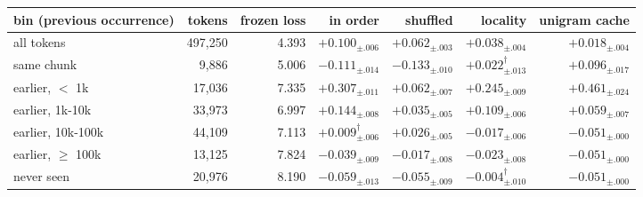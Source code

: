\begin{tabular}{lrrrrrr}
\toprule
bin (previous occurrence) & tokens & frozen loss & in order & shuffled & locality & unigram cache \\
\midrule
all tokens & 497,250 & 4.393 & $+0.100_{\pm .006}$ & $+0.062_{\pm .003}$ & $+0.038_{\pm .004}$ & $+0.018_{\pm .004}$ \\
same chunk & 9,886 & 5.006 & $-0.111_{\pm .014}$ & $-0.133_{\pm .010}$ & $+0.022_{\pm .013}^{\dagger}$ & $+0.096_{\pm .017}$ \\
earlier, $<$ 1k & 17,036 & 7.335 & $+0.307_{\pm .011}$ & $+0.062_{\pm .007}$ & $+0.245_{\pm .009}$ & $+0.461_{\pm .024}$ \\
earlier, 1k-10k & 33,973 & 6.997 & $+0.144_{\pm .008}$ & $+0.035_{\pm .005}$ & $+0.109_{\pm .006}$ & $+0.059_{\pm .007}$ \\
earlier, 10k-100k & 44,109 & 7.113 & $+0.009_{\pm .006}^{\dagger}$ & $+0.026_{\pm .005}$ & $-0.017_{\pm .006}$ & $-0.051_{\pm .000}$ \\
earlier, $\geq$ 100k & 13,125 & 7.824 & $-0.039_{\pm .009}$ & $-0.017_{\pm .008}$ & $-0.023_{\pm .008}$ & $-0.051_{\pm .000}$ \\
never seen & 20,976 & 8.190 & $-0.059_{\pm .013}$ & $-0.055_{\pm .009}$ & $-0.004_{\pm .010}^{\dagger}$ & $-0.051_{\pm .000}$ \\
\bottomrule
\end{tabular}

